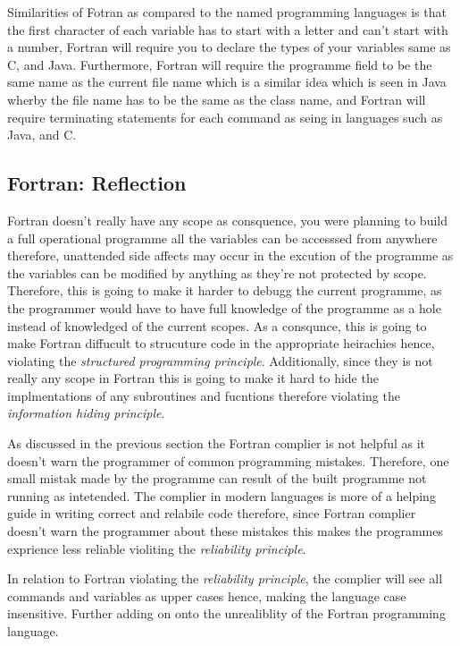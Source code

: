 \documentclass[
	12pt, %
]{fphw}
\begin{document}
Similarities of Fotran as compared to the named programming languages is that
the first character of each variable has to start with a letter and can't start
with a number, Fortran will require you to declare the types of your variables
same as C, and Java. Furthermore, Fortran will require the programme field to be
the same name as the current file name which is a similar idea which is seen in
Java wherby the file name has to be the same as the class name, and Fortran will
require terminating statements for each command as seing in languages such as
Java, and C.

\subsection{Fortran: Reflection}

Fortran doesn't really have any scope as consquence, you were planning to build
a full operational programme all the variables can be accesssed from anywhere
therefore, unattended side affects may occur in the excution of the programme as
the variables can be modified by anything as they're not protected by scope.
Therefore, this is going to make it harder to debugg the current programme, as the
programmer would have to have full knowledge of the programme as a hole instead
of knowledged of the current scopes. As a consqunce, this is going to make Fortran
diffucult to strucuture code in the appropriate heirachies hence, violating the
\emph{structured programming principle}. Additionally, since they is not really
any scope in Fortran this is going to make it hard to hide the implmentations of
any subroutines and fucntions therefore violating the \emph{information hiding
principle}.\par


As discussed in the previous section the Fortran complier is not helpful as it
doesn't warn the programmer of common programming mistakes. Therefore, one small
mistak made by the programme can result of the built programme not running as
intetended. The complier in modern languages is more of a helping guide in writing
correct and relabile code therefore, since Fortran complier doesn't warn the
programmer about these mistakes this makes the programmes exprience less reliable
violiting the \emph{reliability principle}.\par

In relation to Fortran violating the \emph{reliability principle}, the complier
will see all commands and variables as upper cases hence, making the language
case insensitive. Further adding on onto the unrealiblity of the Fortran
programming language.\par
\end{document}

